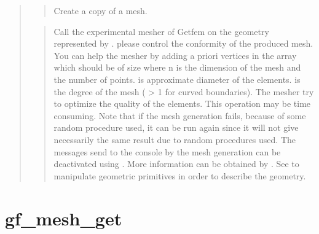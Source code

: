 \documentclass[a4paper,11pt,english]{sphinxmanual}
\begin{document}
\begin{quote}
\begin{quote}
\begin{itemize}
\end{itemize}
\end{quote}

\begin{quote}

Create a copy of a mesh.
\end{quote}

\begin{quote}

Call the experimental mesher of Getfem on the geometry
represented by . please control the conformity of the produced mesh.
You can help the mesher by adding a priori vertices in the array
 which should be of size  where  n is the
dimension of the mesh and  the number of points.  is
approximate diameter of the elements.  is the degree of the
mesh ( \textgreater{} 1 for curved boundaries).  The mesher try to optimize the
quality of the elements. This operation may be time consuming.
Note that if the mesh generation fails, because of some random
procedure used, it can be run again since it will not give necessarily
the same result due to random procedures used.
The messages send to the console by the mesh generation can be
deactivated using . More information
can be obtained by . See 
to manipulate geometric primitives in order to describe the geometry.
\end{quote}
\end{quote}


\section{gf\_mesh\_get}
\label{\detokenize{matlab_octave/cmdref_gf_mesh_get:gf-mesh-get}}\label{\detokenize{matlab_octave/cmdref_gf_mesh_get::doc}}
\end{document}
